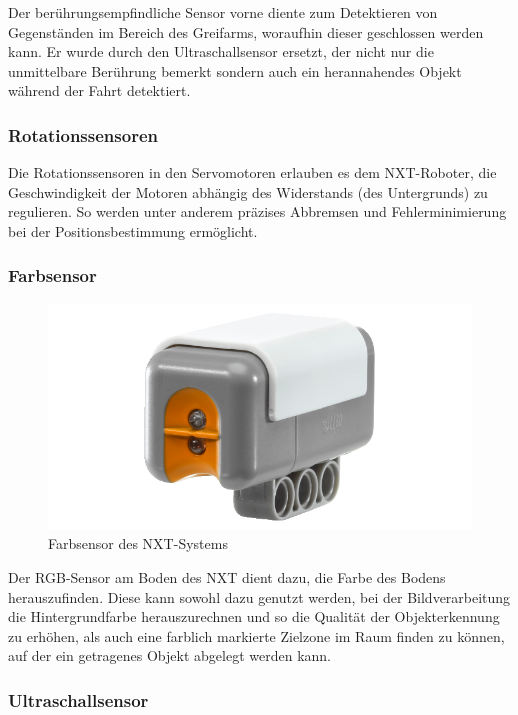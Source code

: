 Der berührungsempfindliche Sensor vorne diente zum Detektieren von Gegenständen im Bereich des Greifarms, woraufhin dieser geschlossen werden kann. Er wurde durch den Ultraschallsensor ersetzt, der nicht nur die unmittelbare Berührung bemerkt sondern auch ein herannahendes Objekt während der Fahrt detektiert.

\subsubsection{Rotationssensoren}

Die Rotationssensoren in den Servomotoren erlauben es dem NXT-Roboter, die Geschwindigkeit der Motoren abhängig des Widerstands (des Untergrunds) zu regulieren. So werden unter anderem präzises Abbremsen und Fehlerminimierung bei der Positionsbestimmung ermöglicht.

\subsubsection{Farbsensor}

\begin{figure}[h]
\centering
\includegraphics[width=\textwidth/3]{Bilder/Robot/color_sensor}
\caption{Farbsensor des NXT-Systems}
\label{fig:colorSensor}
\end{figure}

Der RGB-Sensor am Boden des NXT dient dazu, die Farbe des Bodens herauszufinden. Diese kann sowohl dazu genutzt werden, bei der Bildverarbeitung die Hintergrundfarbe herauszurechnen und so die Qualität der Objekterkennung zu erhöhen, als auch eine farblich markierte Zielzone im Raum finden zu können, auf der ein getragenes Objekt abgelegt werden kann.

\subsubsection{Ultraschallsensor}
\label{subsec:Ultraschall}

